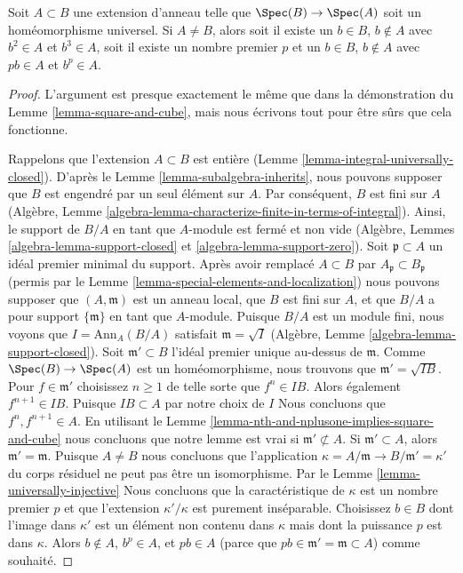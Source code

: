\begin{lemma}
\label{lemma-pth-power-and-multiple}
Soit $A \subset B$ une extension d'anneau telle que $\Spec(B) \to \Spec(A)$ soit un homéomorphisme
universel. Si
$A \not = B$, alors soit il existe un $b \in B$, $b \not \in A$ avec $b^2 \in A$
et $b^3 \in A$, soit il existe un nombre premier $p$
et un $b \in B$, $b \not \in A$ avec $pb \in A$ et $b^p \in A$.
\end{lemma}

\begin{proof}
L'argument est presque exactement le même que dans la démonstration
du Lemme \ref{lemma-square-and-cube}, mais nous écrivons tout pour être
sûrs que cela fonctionne.

\medskip\noindent
Rappelons que l'extension $A \subset B$ est
entière (Lemme \ref{lemma-integral-universally-closed}). D'après le Lemme
\ref{lemma-subalgebra-inherits}, nous pouvons supposer
que $B$ est engendré par un seul élément
sur $A$. Par conséquent,
$B$ est fini sur $A$ (Algèbre, Lemme \ref{algebra-lemma-characterize-finite-in-terms-of-integral}). Ainsi,
le support de $B/A$ en tant que
$A$-module est fermé et
non vide (Algèbre, Lemmes \ref{algebra-lemma-support-closed} et \ref{algebra-lemma-support-zero}). Soit $\mathfrak p \subset A$
un idéal premier minimal du support.
Après avoir remplacé $A \subset B$ par
$A_\mathfrak p \subset B_\mathfrak p$ (permis par le Lemme \ref{lemma-special-elements-and-localization}) nous
pouvons supposer que $(A, \mathfrak m)$ est un anneau
local, que $B$ est fini sur $A$,
et que $B/A$ a pour support $\{\mathfrak m\}$ en tant que
$A$-module. Puisque $B/A$ est
un module fini, nous voyons que $I = \text{Ann}_A(B/A)$ satisfait $\mathfrak m = \sqrt{I}$
(Algèbre, Lemme \ref{algebra-lemma-support-closed}). Soit $\mathfrak m' \subset B$
l'idéal premier unique au-dessus de $\mathfrak m$.
Comme $\Spec(B) \to \Spec(A)$ est un homéomorphisme, nous trouvons que
$\mathfrak m' = \sqrt{IB}$. Pour $f \in \mathfrak m'$ choisissez
$n \geq 1$ de telle sorte que $f^n \in IB$.
Alors également $f^{n + 1} \in IB$.
Puisque $IB \subset A$ par notre choix de $I$ Nous
concluons que $f^n, f^{n + 1} \in A$.
En utilisant le Lemme \ref{lemma-nth-and-nplusone-implies-square-and-cube} nous concluons
que notre lemme est vrai si $\mathfrak m' \not \subset A$. Si $\mathfrak m' \subset A$,
alors $\mathfrak m' = \mathfrak m$. Puisque $A \not = B$ nous concluons
que l'application $\kappa = A/\mathfrak m \to B/\mathfrak m' = \kappa'$ du corps
résiduel ne peut pas être un isomorphisme.
Par le Lemme \ref{lemma-universally-injective} Nous concluons
que la caractéristique de $\kappa$ est un
nombre premier $p$ et que l'extension $\kappa'/\kappa$
est purement inséparable. Choisissez $b \in B$
dont l'image dans $\kappa'$ est un élément
non contenu dans $\kappa$ mais dont la puissance $p$
est dans $\kappa$. Alors $b \not \in A$, $b^p \in A$,
et $pb \in A$ (parce que $pb \in \mathfrak m' = \mathfrak m \subset A$) comme
souhaité.
\end{proof}

